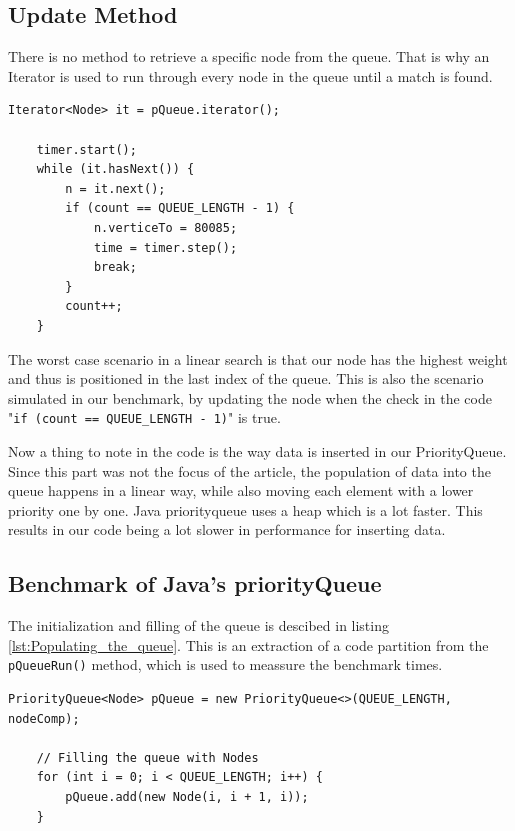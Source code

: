 \documentclass{article}
\begin{document}
\subsection{Update Method} %
There is no method to retrieve a specific node from the queue.
That is why an Iterator is used to run through every node in the queue until a match is found.

\begin{lstlisting}[caption={Finding the node},label={lst:Finding_the_node}]
    Iterator<Node> it = pQueue.iterator();

    timer.start();
    while (it.hasNext()) {
        n = it.next();
        if (count == QUEUE_LENGTH - 1) {
            n.verticeTo = 80085;
            time = timer.step();
            break;
        }
        count++;
    }
\end{lstlisting}

The worst case scenario in a linear search is that our node has the highest 
weight and thus is positioned in the last index of the queue. 
This is also the scenario simulated in our benchmark, by updating the node 
when the check in the code "\lstinline{if (count == QUEUE_LENGTH - 1)}" is true.

Now a thing to note in the code is the way data is inserted in our PriorityQueue. 
Since this part was not the focus of the article, the population of data into the 
queue happens in a linear way, while also moving each element with a lower priority 
one by one. 
Java priorityqueue uses a heap which is a lot faster. This results in our code being 
a lot slower in performance for inserting data.


\subsection{Benchmark of Java's priorityQueue} %
\label{sec:javabenchmark}
The initialization and filling of the queue is descibed in listing \ref{lst:Populating_the_queue}. 
This is an extraction of a code partition from the \lstinline{pQueueRun()} method, 
which is used to meassure the benchmark times.

\begin{lstlisting}[caption={Populating the queue},label={lst:Populating_the_queue}]
    PriorityQueue<Node> pQueue = new PriorityQueue<>(QUEUE_LENGTH, nodeComp);

    // Filling the queue with Nodes
    for (int i = 0; i < QUEUE_LENGTH; i++) {
        pQueue.add(new Node(i, i + 1, i));
    }
\end{lstlisting}
\end{document}
